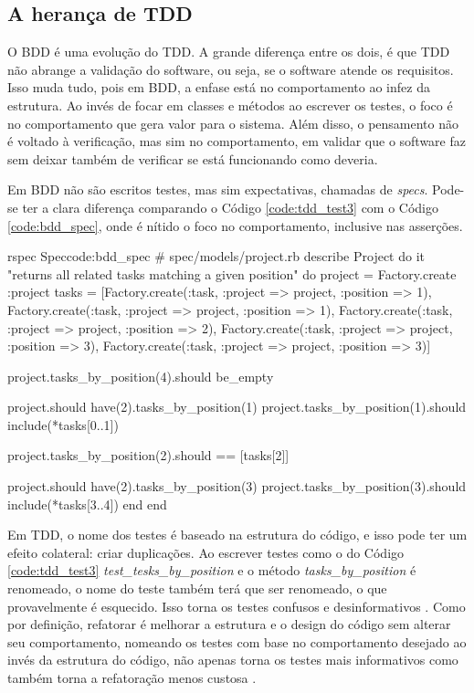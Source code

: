 \subsection{A herança de TDD}
\label{sub:a_heranca_de_tdd}

O BDD é uma evolução do TDD. A grande diferença entre os dois, é que TDD não abrange a validação do software, ou seja, se o software atende os requisitos. Isso muda tudo, pois em BDD, a enfase está no comportamento ao infez da estrutura. Ao invés de focar em classes e métodos ao escrever os testes, o foco é no comportamento que gera valor para o sistema. Além disso, o pensamento não é voltado à verificação, mas sim no comportamento, em validar que o software faz sem deixar também de verificar se está funcionando como deveria.

Em BDD não são escritos testes, mas sim expectativas, chamadas de \textit{specs}. Pode-se ter a clara diferença comparando o Código \ref{code:tdd_test3} com o Código \ref{code:bdd_spec}, onde é nítido o foco no comportamento, inclusive nas asserções.

\begin{mycode}{rspec}%
{Spec}{code:bdd_spec}
# spec/models/project.rb
describe Project do
  it "returns all related tasks matching a given position" do
    project = Factory.create :project
    tasks = [Factory.create(:task, :project => project, :position => 1),
             Factory.create(:task, :project => project, :position => 1),
             Factory.create(:task, :project => project, :position => 2),
             Factory.create(:task, :project => project, :position => 3),
             Factory.create(:task, :project => project, :position => 3)]

    project.tasks_by_position(4).should be_empty

    project.should have(2).tasks_by_position(1)
    project.tasks_by_position(1).should include(*tasks[0..1])

    project.tasks_by_position(2).should == [tasks[2]]

    project.should have(2).tasks_by_position(3)
    project.tasks_by_position(3).should include(*tasks[3..4])
  end
end
\end{mycode}

Em TDD, o nome dos testes é baseado na estrutura do código, e isso pode ter um efeito colateral: criar duplicações. Ao escrever testes como o do Código \ref{code:tdd_test3} \textit{test\_tesks\_by\_position} e o método \textit{tasks\_by\_position} é renomeado, o nome do teste também terá que ser renomeado, o que provavelmente é esquecido. Isso torna os testes confusos e desinformativos \cite{ContinuousTesting}. Como por definição, refatorar é melhorar a estrutura e o design do código sem alterar seu comportamento, nomeando os testes com base no comportamento desejado ao invés da estrutura do código, não apenas torna os testes mais informativos como também torna a refatoração menos custosa \cite{ContinuousTesting}.

